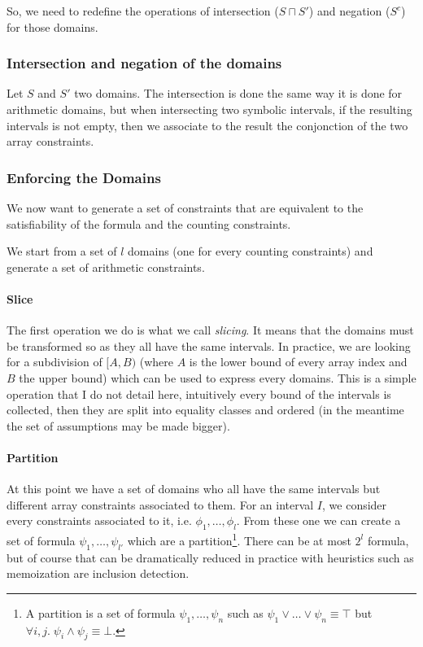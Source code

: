 \documentclass[]{article}
\begin{document}
So, we need to redefine the operations of intersection ($S \sqcap S'$)
and negation ($S^c$) for those domains.

\subsubsection{Intersection and negation of the
domains}\label{intersection-and-negation-of-the-domains}

Let $S$ and $S'$ two domains. The intersection is done the same way
it is done for arithmetic domains, but when intersecting two symbolic
intervals, if the resulting intervals is not empty, then we associate to
the result the conjonction of the two array constraints.

\subsubsection{Enforcing the Domains}\label{enforcing-the-domains}

We now want to generate a set of constraints that are equivalent to the
satisfiability of the formula and the counting constraints.

We start from a set of $l$ domains (one for every counting
constraints) and generate a set of arithmetic constraints.

\paragraph{Slice}\label{slice}

The first operation we do is what we call \emph{slicing}. It means that
the domains must be transformed so as they all have the same intervals.
In practice, we are looking for a subdivision of $[A, B)$ (where $A$
is the lower bound of every array index and $B$ the upper bound) which
can be used to express every domains. This is a simple operation that I
do not detail here, intuitively every bound of the intervals is
collected, then they are split into equality classes and ordered (in the
meantime the set of assumptions may be made bigger).

\paragraph{Partition}\label{partition}

At this point we have a set of domains who all have the same intervals
but different array constraints associated to them. For an interval
$I$, we consider every constraints associated to it, i.e.
$\phi_1, \ldots, \phi_l$. From these one we can create a set of formula
$\psi_1, \ldots, \psi_{l'}$ which are a
partition\footnote{A partition is a set of formula $\psi_1, \ldots, \psi_n$ such as $\psi_1 \lor \ldots \lor \psi_n \equiv \top$ but $\forall i, j. \; \psi_i \land \psi_j \equiv \bot$.}.
There can be at most $2^l$ formula, but of course that can be
dramatically reduced in practice with heuristics such as memoization are
inclusion detection.
\end{document}
